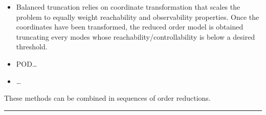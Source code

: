 \documentclass[letterpaper,10pt,english]{jupyterBook}
\begin{document}
\begin{itemize}
\item {} 
\sphinxAtStartPar
{} Balanced truncation relies on coordinate transformation that scales the problem to equally weight reachability and observability properties. Once the coordinates have been transformed, the reduced order model is obtained truncating every modes whose reachability/controllability is below a desired threshold.

\item {} 
\sphinxAtStartPar
{} POD…

\item {} 
\sphinxAtStartPar
…

\end{itemize}

\sphinxAtStartPar
These methods can be combined in sequences of order reductions.


\bigskip\hrule\bigskip


\sphinxstepscope
\end{document}
